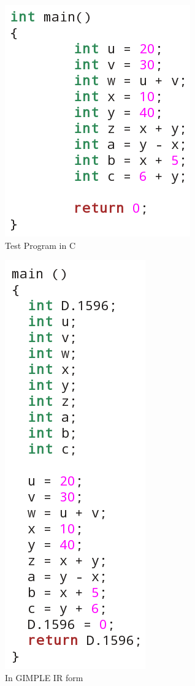 \begin{figure}[htb]
\centering
\includegraphics{./test-program1}
\caption{Test Program in C}
\label{fig:testprog}
\end{figure}

\begin{figure}[htb]
\centering
\includegraphics{./gimple1}
\caption{In GIMPLE IR form}
\label{fig:gimple}
\end{figure}

